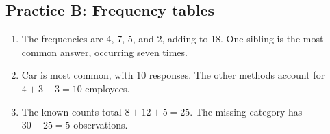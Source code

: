 \documentclass[12pt,letterpaper]{article}
\begin{document}
\subsection*{Practice B: Frequency tables}
\begin{enumerate}[label=B\arabic*.,leftmargin=2.5em,itemsep=10pt]
\item \par{}\par\medskip
The frequencies are 4, 7, 5, and 2, adding to 18. One sibling is the most common answer, occurring seven times.
\item \par{}\par\medskip
Car is most common, with 10 responses. The other methods account for $4+3+3=10$ employees.
\item The known counts total $8+12+5=25$. The missing category has $30-25=5$ observations.
\end{enumerate}
\end{document}
